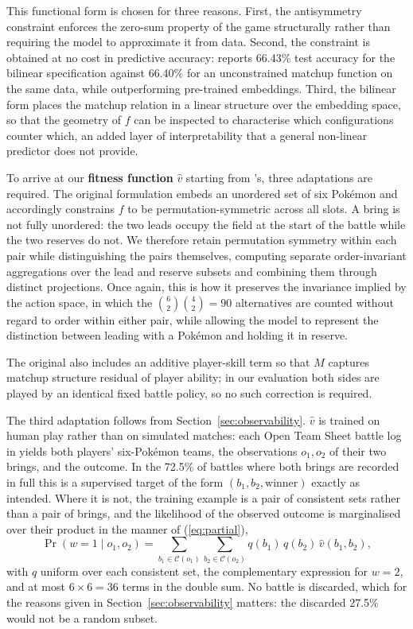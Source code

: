 \documentclass[conference]{IEEEtran}
\begin{document}
This functional form is chosen for three reasons. First, the antisymmetry
constraint enforces the zero-sum property of the game structurally rather than
requiring the model to approximate it from data. Second, the constraint
is obtained at no cost in predictive accuracy: \cite{oblander2025} reports
66.43\% test accuracy for the bilinear specification against 66.40\% for an
unconstrained matchup function on the same data, while
outperforming pre-trained embeddings. Third, the bilinear form
places the matchup relation in a linear structure over the embedding space,
so that the geometry of $f$ can be inspected to characterise which
configurations counter which, an added layer of interpretability that a general
non-linear predictor does not provide.

To arrive at our \textbf{fitness function} $\hat{v}$ starting from \cite{oblander2025}'s, three adaptations are required. The original formulation embeds an unordered set of six Pok\'emon and
accordingly constrains $f$ to be permutation-symmetric across all slots. A
bring is not fully unordered: the two leads occupy the field at the start of
the battle while the two reserves do not. We therefore retain permutation
symmetry within each pair while distinguishing the pairs themselves, computing
separate order-invariant aggregations over the lead and reserve subsets and
combining them through distinct projections. Once again, this is how it preserves the invariance
implied by the action space, in which the $\binom{6}{2}\binom{4}{2} = 90$
alternatives are counted without regard to order within either pair, while
allowing the model to represent the distinction between leading with a
Pok\'emon and holding it in reserve. 

The original
also includes an additive player-skill term so that $M$ captures matchup
structure residual of player ability; in our evaluation both sides are played
by an identical fixed battle policy, so no such correction is required.

The third adaptation follows from Section~\ref{sec:observability}. $\hat{v}$ is
trained on human play rather than on simulated matches: each Open Team Sheet
battle log in \cite{angliss2026} yields both players' six-Pok\'emon teams, the
observations $o_1, o_2$ of their two brings, and the outcome. In the 72.5\% of
battles where both brings are recorded in full this is a supervised target of
the form $(b_1, b_2, \text{winner})$ exactly as intended. Where it is not, the
training example is a pair of consistent sets rather than a pair of brings, and
the likelihood of the observed outcome is marginalised over their product in
the manner of (\ref{eq:partial}),
\begin{equation}
\Pr(w{=}1 \mid o_1, o_2) = \!\!\!\sum_{b_1 \in \mathcal{C}(o_1)} \sum_{b_2 \in \mathcal{C}(o_2)} \!\!\! q(b_1)\, q(b_2)\, \hat{v}(b_1,b_2) ,
\label{eq:marginal}
\end{equation}
\noindent with $q$ uniform over each consistent set, the complementary
expression for $w{=}2$, and at most $6 \times 6 = 36$ terms in the double sum.
No battle is discarded, which for the reasons given in
Section~\ref{sec:observability} matters: the discarded 27.5\% would not be a
random subset.
\end{document}
